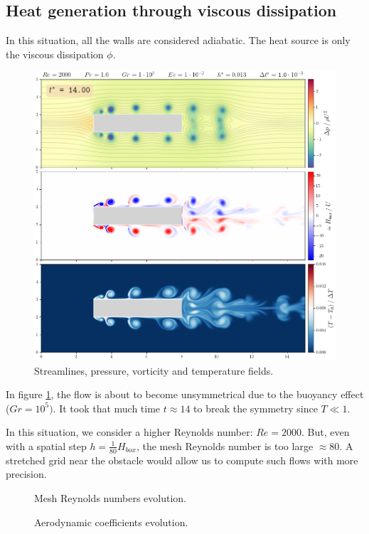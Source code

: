 \documentclass[11 pt]{article}
\begin{document}
\subsection{Heat generation through viscous dissipation}
In this situation, all the walls are considered adiabatic. The heat source is only the viscous dissipation $\phi$.

\begin{figure}[H]
    \centering
    \includegraphics[width=\textwidth]{../figures/frame_00140_eckert.png}
    \caption{Streamlines, pressure, vorticity and temperature fields.}
    \label{fig:simu_eckert}
\end{figure}

In figure \ref{fig:simu_eckert}, the flow is about to become unsymmetrical due to the buoyancy effect ($Gr=10^5)$. It took that much time $t \approx 14$ to break the symmetry since $T \ll 1$.

In this situation, we consider a higher Reynolds number: $Re=2000$. But, even with a spatial step $h=\frac{1}{80} H_{box}$, the mesh Reynolds number is too large $\approx 80$. A stretched grid near the obstacle would allow us to compute such flows with more precision.

\begin{figure}[H]
    \centering
    
    \caption{Mesh Reynolds numbers evolution.}
    \label{fig:mesh_re_eckert}
\end{figure}

\begin{figure}[H]
    \centering
    
    \caption{Aerodynamic coefficients evolution.}
    \label{fig:drag_eckert}
\end{figure}


\newpage


\nocite{*}

\end{document}
